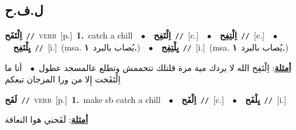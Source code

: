 \documentclass[10pt,a4paper,twoside]{article} %
\begin{document}
\begin{multicols}{2}
\vspace{-3mm}
\subsection*{\color{blue}\foreignlanguage{arabic}{ل.ف.ح}\color{blue}{}} 

{\setlength\topsep{0pt}\textbf{\foreignlanguage{arabic}{اِلْتَفَح}}\ {\color{gray}\texttt{//}\color{black}}\ \textsc{verb}\ [p.]\ \textbf{1.}~catch a chill\ \ $\bullet$\ \ \setlength\topsep{0pt}\textbf{\foreignlanguage{arabic}{اِلْتَفِح}}\ {\color{gray}\texttt{//}\color{black}}\ [c.]\ \ $\bullet$\ \ \setlength\topsep{0pt}\textbf{\foreignlanguage{arabic}{اِلْتِفِح}}\ {\color{gray}\texttt{//}\color{black}}\ [c.]\ \ $\bullet$\ \ \setlength\topsep{0pt}\textbf{\foreignlanguage{arabic}{يِلْتَفِح}}\ {\color{gray}\texttt{//}\color{black}}\ [i.]\ \color{gray}(msa. \foreignlanguage{arabic}{يُصاب بالبرد}~\foreignlanguage{arabic}{\textbf{١.}})\color{black}\ \ $\bullet$\ \ \setlength\topsep{0pt}\textbf{\foreignlanguage{arabic}{يِلْتِفِح}}\ {\color{gray}\texttt{//}\color{black}}\ [i.]\ \color{gray}(msa. \foreignlanguage{arabic}{يُصاب بالبرد}~\foreignlanguage{arabic}{\textbf{١.}})\color{black}\  \begin{flushright}\color{gray}\foreignlanguage{arabic}{\textbf{\underline{\foreignlanguage{arabic}{أمثلة}}}: اِلْتَفِح الله لا يردك مية مرة قلتلك تتحممش وتطلع عالمسجد عطول\ $\bullet$\ \  أنا ما اِلْتَفَحت إِلا من ورا المزجان تبعكم}\end{flushright}\color{black}} \vspace{2mm}

{\setlength\topsep{0pt}\textbf{\foreignlanguage{arabic}{لَفَح}}\ {\color{gray}\texttt{//}\color{black}}\ \textsc{verb}\ [p.]\ \textbf{1.}~make sb catch a chill\ \ $\bullet$\ \ \setlength\topsep{0pt}\textbf{\foreignlanguage{arabic}{اِلْفَح}}\ {\color{gray}\texttt{//}\color{black}}\ [c.]\ \ $\bullet$\ \ \setlength\topsep{0pt}\textbf{\foreignlanguage{arabic}{يِلْفَح}}\ {\color{gray}\texttt{//}\color{black}}\ [i.]\  \begin{flushright}\color{gray}\foreignlanguage{arabic}{\textbf{\underline{\foreignlanguage{arabic}{أمثلة}}}: لَفَحني هوا النعافة}\end{flushright}\color{black}} \vspace{2mm}


\end{multicols}
\end{document}
